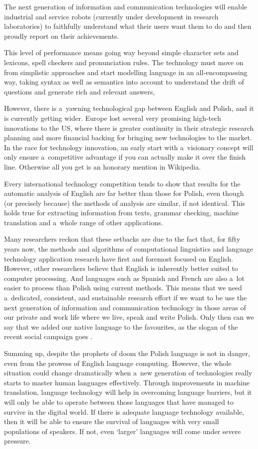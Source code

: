 \begin{multicols}{2}
The next generation of information and communication technologies will
enable industrial and service robots (currently under development in
research laboratories) to faithfully understand what their users want
them to do and then proudly report on their achievements. 

This level of performance means going way beyond simple character sets
and lexicons, spell checkers and pronunciation rules. The technology
must move on from simplistic approaches and start modelling language
in an all-encompassing way, taking syntax as well as semantics into
account to understand the drift of questions and generate rich and
relevant answers, 

However, there is a~yawning technological gap between English and
Polish, and it is currently getting wider. Europe lost several very
promising high-tech innovations to the US, where there is greater
continuity in their strategic research planning and more financial
backing for bringing new technologies to the market. In the race for
technology innovation, an early start with a~visionary concept will
only ensure a~competitive advantage if you can actually make it over
the finish line. Otherwise all you get is an honorary mention in
Wikipedia. 

Every international technology competition tends to show that results
for the automatic analysis of English are far better than those for
Polish, even though (or precisely because) the methods of analysis are
similar, if not identical. This holds true for extracting information
from texts, grammar checking, machine translation and a~whole range of
other applications. 

Many researchers reckon that these setbacks are due to the fact that,
for fifty years now, the methods and algorithms of computational
linguistics and language technology application research have first
and foremost focused on English. However, other researchers believe
that English is inherently better suited to computer processing. And
languages such as Spanish and French are also a~lot easier to process
than Polish using current methods. This means that we need
a~dedicated, consistent, and sustainable research effort if we want to
be use the next generation of information and communication technology
in those areas of our private and work life where we live, speak and
write Polish. Only then can we say that we added our native language
to the favourites, as the slogan of the recent social campaign goes
\cite{rjp1}. 

Summing up, despite the prophets of doom the Polish language is not in
danger, even from the prowess of English language computing. However,
the whole situation could change dramatically when a~new generation of
technologies really starts to master human languages effectively.
Through improvements in machine translation, language technology will
help in overcoming language barriers, but it will only be able to
operate between those languages that have managed to survive in the
digital world. If there is adequate language technology available,
then it will be able to ensure the survival of languages with very
small populations of speakers. If not, even ‘larger’ languages
will come under severe pressure. 


\end{multicols}
